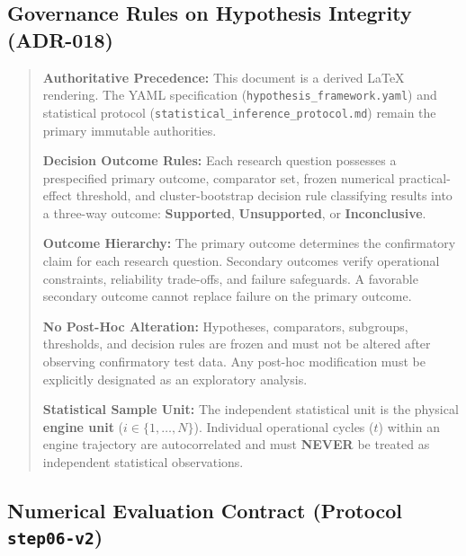 
\subsection*{Governance Rules on Hypothesis Integrity (ADR-018)}

\begin{quote}
\textbf{Authoritative Precedence:} This document is a derived LaTeX rendering. The YAML specification (\texttt{hypothesis\_framework.yaml}) and statistical protocol (\texttt{statistical\_inference\_protocol.md}) remain the primary immutable authorities.

\textbf{Decision Outcome Rules:} Each research question possesses a prespecified primary outcome, comparator set, frozen numerical practical-effect threshold, and cluster-bootstrap decision rule classifying results into a three-way outcome: \textbf{Supported}, \textbf{Unsupported}, or \textbf{Inconclusive}.

\textbf{Outcome Hierarchy:} The primary outcome determines the confirmatory claim for each research question. Secondary outcomes verify operational constraints, reliability trade-offs, and failure safeguards. A favorable secondary outcome cannot replace failure on the primary outcome.

\textbf{No Post-Hoc Alteration:} Hypotheses, comparators, subgroups, thresholds, and decision rules are frozen and must not be altered after observing confirmatory test data. Any post-hoc modification must be explicitly designated as an exploratory analysis.

\textbf{Statistical Sample Unit:} The independent statistical unit is the physical \textbf{engine unit} ($i \in \{1, \dots, N\}$). Individual operational cycles ($t$) within an engine trajectory are autocorrelated and must \textbf{NEVER} be treated as independent statistical observations.
\end{quote}

\subsection*{Numerical Evaluation Contract (Protocol \texttt{step06-v2})}

